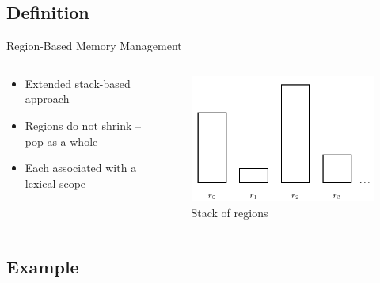 \documentclass[xcolor=x11names,compress]{beamer}
\renewcommand{\(}{\begin{columns}}
\renewcommand{\)}{\end{columns}}
\newcommand{\<}[1]{\begin{column}{#1}}
\renewcommand{\>}{\end{column}}
\begin{document}
\subsection{Definition}
\begin{frame}{Region-Based Memory Management}
    \begin{columns}[T]
        \begin{column}{.48\textwidth}
            \begin{itemize}
                \item Extended stack-based approach
                \item Regions do not shrink -- pop as a whole
                \item Each associated with a lexical scope
            \end{itemize}
        \end{column}
        \hfill
        \begin{column}{.48\textwidth}
            \begin{figure}[h]
                \includegraphics[width=\textwidth]{regions-blocks.png}
                \caption{Stack of regions}
            \end{figure}
        \end{column}
    \end{columns}
\end{frame}

\subsection{Example}
\end{document}

